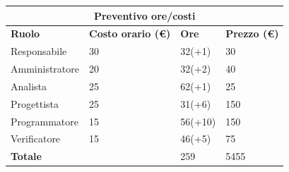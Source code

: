 \documentclass[a4paper, 12pt]{article}
\begin{document}
\begin{center}
	\begin{tabularx}{\textwidth}{|X|X|X|X|}
		\hline
		\multicolumn{4}{|c|}{\textbf{Preventivo ore/costi}}                                      \\
		\hline
		\hline
		\textbf{Ruolo}  & \textbf{Costo orario (\euro)} & \textbf{Ore} & \textbf{Prezzo (\euro)} \\
		\hline
		Responsabile    & 30                            & 32(+1)       & 30                      \\
		\hline
		Amministratore  & 20                            & 32(+2)       & 40                      \\
		\hline
		Analista        & 25                            & 62(+1)       & 25                      \\
		\hline
		Progettista     & 25                            & 31(+6)       & 150                     \\
		\hline
		Programmatore   & 15                            & 56(+10)      & 150                     \\
		\hline
		Verificatore    & 15                            & 46(+5)       & 75                      \\
		\hline
		\hline
		\textbf{Totale} &                               & 259          & 5455                    \\
		\hline
	\end{tabularx}\\[8pt]
	\mbox{}\\
\end{center}
\end{document}

